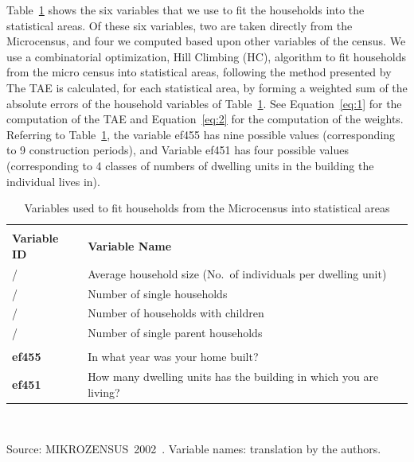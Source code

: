 \documentclass[11pt]{IJM-article}
\begin{document}
Table~\ref{tab:2} shows the six variables that we use to fit the households
into the statistical areas. Of these six variables, two are taken directly from
the Microcensus, and four we computed based upon other variables of the census.
We use a combinatorial optimization, Hill Climbing (HC), algorithm to fit
households from the micro census into statistical areas, following the method
presented by  The TAE is calculated, for
each statistical area, by forming a weighted sum of the absolute errors of the
household variables of Table~\ref{tab:2}. See Equation~\ref{eq:1} for the
computation of the TAE and Equation~\ref{eq:2} for the computation of the
weights. Referring to Table~\ref{tab:2}, the variable ef455 has nine possible
values (corresponding to 9 construction periods), and Variable ef451 has four
possible values (corresponding to 4 classes of numbers of dwelling units in the
building the individual lives in).\\

\begin{table}[htb]
    \centering
    \caption{Variables used to fit households from the Microcensus into
    statistical areas}\label{tab:2}
    \begin{tabular}{l l}
        \addlinespace \toprule
        \multicolumn{2}{l}{\textbf{Constructed variables} }\\ 
        \textbf{Variable ID} & \textbf{Variable Name} \\ 
        / & Average household size (No.\ of individuals per dwelling unit)\\ 
        / & Number of single households\\ 
        / & Number of households with children\\ 
        / & Number of single parent households\\ 
        \midrule \addlinespace
        \multicolumn{2}{l}{\textbf{Variables directly taken from the micro-census} }\\
        \textbf{ef455} & In what year was your home built?\\ 
        \textbf{ef451} & How many dwelling units has the building in which you 
            are living?\\ 
        \bottomrule 
    \end{tabular} \\
        \begin{footnotesize} 
            Source: MIKROZENSUS~2002~\cite{StatistischesBundesamt.2002}. 
            Variable names: translation by the authors.\\ 
        \end{footnotesize} 
\end{table}
\end{document}
